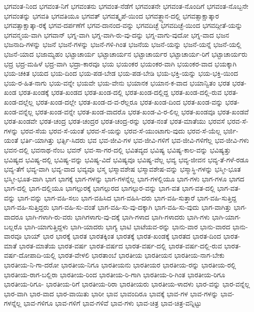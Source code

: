 {ಭಗವಂತ-ನಿಂದ
ಭಗವಂತ-ನಿಗೆ
ಭಗವಂತನು
ಭಗವಂತ-ನೆಡೆಗೆ
ಭಗವಂತನೇ
ಭಗವಂತ-ನೊಂದಿಗೆ
ಭಗವಂತ-ನೊಬ್ಬನೇ
ಭಗವಂತನ್ನು
ಭಗವತಿ
ಭಗವತಿಯೂ
ಭಗವತ್
ಭಗವತ್ಕೃಪೆ-ಯಿಂದ
ಭಗವತ್ಧ್ಯಾನ-ದಲ್ಲಿ
ಭಗವತ್ಸಾಕ್ಷಾತ್ಕಾರ
ಭಗವತ್ಸಾಕ್ಷಾತ್ಕಾ-ರಕ್ಕೆ
ಭಗವ-ದರ್ಪಣೆಗೆ
ಭಗವ-ದಾನಂದ-ವನ್ನು
ಭಗವದಿಚ್ಛೆ
ಭಗವದಿಚ್ಛೆ-ಯಿಂದ
ಭಗವದ್ಗೀತೆ-ಯನ್ನು
ಭಗವನ್ಮಯ-ವಾಗಿ
ಭಗವಾನ್
ಭಗ್ನ-ವಾಗಿ
ಭಗ್ನ-ವಾಗಿ-ರು-ವು-ದನ್ನು
ಭಗ್ನ-ವಾಗು-ವುದೋ
ಭಗ್ನ-ವಾದ
ಭಜನ
ಭಜನಾದಿ-ಗಳನ್ನು
ಭಜನೆ
ಭಜನೆ-ಗಳನ್ನು
ಭಜನೆ-ಗಳಿ-ಗಿಂತ
ಭಜನೆಯ
ಭಜನೆ-ಯನ್ನು
ಭಜನೆ-ಯನ್ನೆ
ಭಜನೆ-ಯಲ್ಲಿ
ಭಜನೆ-ಯಾದ
ಭಜಾಮ್ಯಹಂ
ಭಟ್ಟಾಚಾರ್ಯ
ಭಟ್ಟಾಚಾರ್ಯನ
ಭಟ್ಟಾಚಾರ್ಯರ
ಭಟ್ಟಾಚಾರ್ಯ-ರಿಗೆ
ಭಟ್ಟಾಚಾರ್ಯರು
ಭದ್ರ
ಭದ್ರ-ಮಹಿಳೆ
ಭದ್ರ-ವಾಗಿ
ಭದ್ರಾ-ಕಾರವೂ
ಭಯ
ಭಯಂಕರ
ಭಯಂಕರ-ವಾಗಿ
ಭಯಂಕರ-ವಾದ
ಭಯಕ್ಕಾಗಿ
ಭಯ-ಚಕಿತ
ಭಯದ
ಭಯ-ದಿಂದ
ಭಯ-ಪಡ-ಬೇಡ
ಭಯ-ಪಡ-ಬೇಡಿ
ಭಯ-ಭಕ್ತಿ-ಯನ್ನು
ಭಯ-ಭಕ್ತಿ-ಯಿಂದ
ಭಯ-ರ-ಹಿತ-ನಾಗು
ಭಯ-ವನ್ನೇ
ಭಯವೇ
ಭಯ-ವೇನು
ಭಯಾನಕ
ಭಯಾನ-ಕ-ವಾದ
ಭಯಾನ್ವಿತಂ
ಭರತ
ಭರತ-ಖಂಡ
ಭರತ-ಖಂಡಕ್ಕೆ
ಭರತ-ಖಂಡದ
ಭರತ-ಖಂಡ-ದಲ್ಲಿ
ಭರತ-ಖಂಡ-ದಲ್ಲಿದ್ದ
ಭರತ-ಖಂಡ-ದಲ್ಲಿ-ರುವ
ಭರತ-ಖಂಡ-ದಲ್ಲೆಲ್ಲ
ಭರತ-ಖಂಡ-ದಲ್ಲೇ
ಭರತ-ಖಂಡ-ದ-ವ-ರೆಲ್ಲರೂ
ಭರತ-ಖಂಡ-ದಿಂದ
ಭರತ-ಖಂಡ-ವನ್ನು
ಭರತ-ಖಂಡ-ವನ್ನೆಲ್ಲ
ಭರತ-ಖಂಡ-ವನ್ನೇ
ಭರತ-ಖಂಡ-ವಾದರೊ
ಭರತ-ಖಂಡ-ವಿ-ರ-ಲಿಲ್ಲ
ಭರತ-ಖಂಡವೂ
ಭರತ-ಖಂಡವೆ
ಭರತ-ಖಂಡವೇ
ಭರತ-ಚಂದ್ರ
ಭರತ-ಚಂದ್ರರ
ಭರತ-ಚಂದ್ರ-ರನ್ನು
ಭರತ-ನಂತೆ
ಭರತ-ಮಾತೆಯು
ಭರವಸೆ
ಭರವ-ಸೆ-ಗಳನ್ನು
ಭರವ-ಸೆಯ
ಭರವ-ಸೆ-ಯಂತೆ
ಭರವ-ಸೆ-ಯನ್ನು
ಭರವ-ಸೆ-ಯುಂಟಾಗು-ವುದು
ಭರವ-ಸೆ-ಯೆಲ್ಲ
ಭರ್ಜಿ-ಯಂತೆ
ಭರ್ತಿ-ಯಾಗಿತ್ತು
ಭರ್ತ್ಸಿ-ಸಿದರು
ಭವ
ಭವ-ಜೀವಿ-ಗಳ
ಭವ-ಜೀವಿ-ಗಳಿಗೆ
ಭವ-ಜೀವಿ-ಗಳಿಗೆಲ್ಲ
ಭವ-ಜೀವಿ-ಗಳು
ಭವನ-ದಲ್ಲಿ
ಭವನಾಥ-ನೆಂಬ
ಭವನ್
ಭವ-ಸಾ-ಗರ-ದಲ್ಲಿ
ಭವಿತವ್ಯದ
ಭವಿಷ್ಯ
ಭವಿಷ್ಯ-ಕಾಲ-ವನ್ನು
ಭವಿಷ್ಯತ್ತು
ಭವಿಷ್ಯದ
ಭವಿಷ್ಯ-ದಲ್ಲಿ
ಭವಿಷ್ಯ-ವನ್ನು
ಭವಿಷ್ಯ-ವಿದೆ
ಭವಿಷ್ಯವೂ
ಭವಿಷ್ಯ-ವೆಲ್ಲ
ಭವ್ಯ
ಭವ್ಯ-ಜೀವನ
ಭವ್ಯ-ತೆ-ಗಳೆ-ರಡೂ
ಭವ್ಯ-ತೆಗೆ
ಭವ್ಯ-ವಾಗಿ
ಭವ್ಯ-ವಾದ
ಭವ್ಯವೂ
ಭಸ್ಮ
ಭಸ್ಮಾವಶೇಷ
ಭಸ್ಮಾವಶೇಷ-ವನ್ನು
ಭಸ್ಮಾಸ್ಥಿ-ಗಳನ್ನು
ಭಸ್ಮೀ-ಭೂತ
ಭಸ್ಮೀ-ಭೂತ-ವಾಗಿ
ಭಾಗ
ಭಾಗಕ್ಕೆ
ಭಾಗ-ಗಳನ್ನು
ಭಾಗ-ಗಳನ್ನೆಲ್ಲ
ಭಾಗ-ಗಳಲ್ಲಿಯೂ
ಭಾಗ-ಗಳು
ಭಾಗ-ಗಳೂ
ಭಾಗದ
ಭಾಗ-ದಲ್ಲಿ
ಭಾಗ-ದಲ್ಲಿಯೂ
ಭಾಗಲ್ಪುರಕ್ಕೆ
ಭಾಗಲ್ಪುರದ
ಭಾಗಲ್ಪುರ-ವನ್ನು
ಭಾಗ-ವತ
ಭಾಗ-ವತ-ದಲ್ಲಿ
ಭಾಗ-ವತ-ವನ್ನು
ಭಾಗ-ವನ್ನು
ಭಾಗ-ವಹಿ-ಸಲು
ಭಾಗ-ವಹಿಸಿದ
ಭಾಗ-ವಹಿಸಿ-ದರು
ಭಾಗ-ವಹಿ-ಸುತ್ತಾರೆ
ಭಾಗ-ವಹಿ-ಸುತ್ತಿದ್ದ
ಭಾಗ-ವಹಿ-ಸುತ್ತಿದ್ದರು
ಭಾಗ-ವಹಿ-ಸು-ವಂತೆ
ಭಾಗ-ವಹಿ-ಸು-ವು-ದಕ್ಕಾಗಿ
ಭಾಗ-ವಹಿ-ಸು-ವುದು
ಭಾಗ-ವಾಗಿತ್ತು
ಭಾಗ-ವಾದರೂ
ಭಾಗಿ-ಗಳಾಗಿ-ರು-ವರು
ಭಾಗಿಗಳಾಗು-ವು-ದಕ್ಕೆ
ಭಾಗಿ-ಗಳಾದ
ಭಾಗಿ-ಗಳಾದರು
ಭಾಗಿ-ಗಳು
ಭಾಗಿ-ಯಾಗ-ಬಲ್ಲರೊ
ಭಾಗಿ-ಯಾಗುತ್ತಿದ್ದಳು
ಭಾಗಿ-ಯಾದರು
ಭಾಗ್ಯ
ಭಾಟಿ
ಭಾಟೆಯವ-ರನ್ನು
ಭಾನು-ವಾರ
ಭಾನು-ವಾರದ
ಭಾನು-ವಾರವೂ
ಭಾಯ್
ಭಾರ
ಭಾರಕ್ಕೆ
ಭಾರತ
ಭಾರತಕ್ಕಿಂತ
ಭಾರತಕ್ಕೆ
ಭಾರತ-ಖಂಡಕ್ಕೆ
ಭಾರತದ
ಭಾರತ-ದಿಂದ
ಭಾರತ-ಮಾತೆ
ಭಾರತ-ಮಾತೆಯ
ಭಾರತ-ವರ್ಷ
ಭಾರತ-ವರ್ಷದ
ಭಾರತ-ವರ್ಷ-ದಲ್ಲಿ
ಭಾರತ-ವರ್ಷ-ದಲ್ಲಿ-ರುವ
ಭಾರತ-ವರ್ಷ-ದೋಪಾದಿ-ಯಲ್ಲಿ
ಭಾರತ-ವೇಳಲಿ
ಭಾರತಾಂಬೆ
ಭಾರತೀಯ
ಭಾರತೀಯನ
ಭಾರತೀಯ-ನಾಗ-ಬೇಕು
ಭಾರತೀಯ-ನಿ-ಗಾ-ದರೋ
ಭಾರತೀಯ-ನಿಗೂ
ಭಾರತೀಯನು
ಭಾರತೀಯರ
ಭಾರತೀಯ-ರನ್ನು
ಭಾರತೀಯ-ರಲ್ಲಿ
ಭಾರತೀಯ-ರಾಗ-ಬಲ್ಲಿರಾ
ಭಾರತೀಯ-ರಿಂದ
ಭಾರತೀಯ-ರಿ-ಗಾಗಿ
ಭಾರತೀಯ-ರಿ-ಗಿಂತ
ಭಾರತೀಯ-ರಿಗೂ
ಭಾರತೀಯ-ರಿಗೂ-
ಭಾರತೀಯ-ರಿಗೆ
ಭಾರತೀಯ-ರಿರಾ
ಭಾರತೀಯರು
ಭಾರತೀಯ-ಳಾದಳು
ಭಾರ-ವನ್ನು
ಭಾರ-ವನ್ನೆಲ್ಲ
ಭಾರ-ವಾಗಿ
ಭಾರ-ವಾದ
ಭಾರ-ವಾಯಿತು
ಭಾರೀ
ಭಾವ
ಭಾವಂದಿರೂ
ಭಾವಕ್ಕೆ
ಭಾವ-ಗಳ
ಭಾವ-ಗಳನ್ನು
ಭಾವ-ಗಳನ್ನೆಲ್ಲ
ಭಾವ-ಗಳಿಗೂ
ಭಾವ-ಗಳಿಗೆ
ಭಾವ-ಗಳಿವೆ
ಭಾವ-ಗಳು
ಭಾವ-ಚಿತ್ರ
ಭಾವ-ಚಿತ್ರ-ವನ್ನಿಟ್ಟು
}
